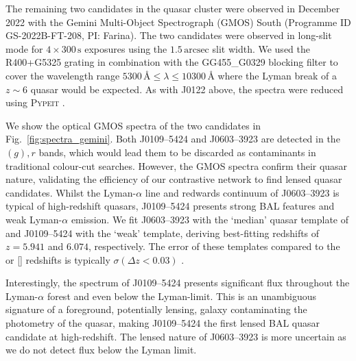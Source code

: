 \documentclass[fleqn,usenatbib]{mnras}
\begin{document}
The remaining two candidates in the quasar cluster were observed in December 2022 with the Gemini Multi-Object Spectrograph (GMOS) South (Programme ID GS-2022B-FT-208, PI: Farina).
The two candidates were observed in long-slit mode for $4\times300\,\text{s}$ exposures using the $1.5\,\text{arcsec}$ slit width.
We used the R400+G5325 grating in combination with the GG455\_G0329 blocking filter to cover the wavelength range $5300\,\text{\AA}\leq \lambda \leq 10300\,\text{\AA}$ where the Lyman break of a $z\sim 6$ quasar would be expected.
As with J0122 above, the spectra were reduced using \textsc{Pypeit} \citep{pypeit:joss_pub}.

We show the optical GMOS spectra of the two candidates in Fig.~\ref{fig:spectra_gemini}. Both J0109--5424 and J0603--3923 are detected in the $(g),r$ bands, which would lead them to be discarded as contaminants in traditional colour-cut searches. However, the GMOS spectra confirm their quasar nature, validating the efficiency of our contrastive network to find lensed quasar candidates.
Whilst the Lyman-$\alpha$ line and redwards continuum of J0603--3923 is typical of high-redshift quasars, J0109--5424 presents strong BAL features and weak Lyman-$\alpha$ emission.
We fit J0603--3923 with the `median' quasar template of \citet{Banados2016} and J0109--5424 with the `weak' template, deriving best-fitting redshifts of $z=5.941$ and $6.074$, respectively.
The error of these templates compared to the  or [] redshifts is typically $\sigma(\Delta z<0.03)$ \citep{banados23}.


Interestingly, the spectrum of J0109--5424 presents significant flux throughout the Lyman-$\alpha$ forest and even below the Lyman-limit.
This is an unambiguous signature of a foreground, potentially lensing, galaxy contaminating the photometry of the quasar, making J0109--5424 the first lensed BAL quasar candidate at high-redshift.
The lensed nature of J0603--3923 is more uncertain as we do not detect flux below the Lyman limit.
\end{document}
